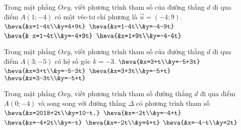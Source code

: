 \begin{ex}%
	Trong mặt phẳng $Oxy$, viết phương trình tham số của đường thẳng $d$ đi qua điểm $A(1;-4)$ có một véc-tơ chỉ phương là $\overrightarrow{u} =(-4;9)$.
	\choice
	{$\heva{&x=1-4t\\&y=4+9t}$}
	{$\heva{&x=1-4t\\&y=-4-9t}$}
	{\True $\heva{& x=1-4t\\&y=-4+9t}$}
	{$\heva{&x=1+9t\\&y=-4-4t}$}
\end{ex}

\begin{ex}%
	Trong mặt phẳng $Oxy$, viết phương trình tham số của đường thẳng $d$ đi qua điểm $A(3;-5)$ có hệ số góc $k=-3$.
	\choice
	{$\heva{&x=3+t\\&y=-5+3t}$}
	{\True$\heva{&x=3+t\\&y=-5-3t}$}
	{$\heva{&x=3+3t\\&y=-5+t}$}
	{$\heva{&x=3-3t\\&y=-5+t}$}
\end{ex}
\begin{ex}%
	Trong mặt phẳng $Oxy$, viết phương trình tham số đường thẳng $d$ đi qua điểm $A(0;-4)$ và song song với đường thẳng $\Delta $ có phương trình tham số $\heva{&x=2018+2t\\&y=10-t.}$
	\choice
	{\True $\heva{&x=-2t\\&y=-4+t}$}
	{$\heva{&x=-4+2t\\&y=-t}$}
	{$\heva{&x=-2t\\&y=4+t}$}
	{$\heva{&x=-4-t\\&y=2t}$}
\end{ex}
